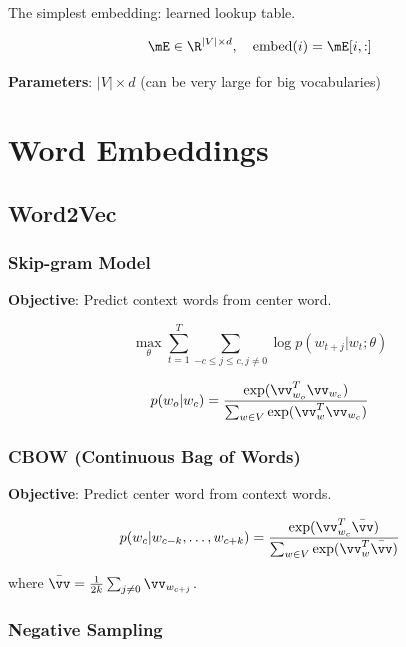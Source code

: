 The simplest embedding: learned lookup table.

\begin{equation}
\mE \in \R^{|V| \times d}, \quad \text{embed}(i) = \mE[i, :]
\end{equation}

\textbf{Parameters}: $|V| \times d$ (can be very large for big vocabularies)

\section{Word Embeddings}
\label{sec:word_embeddings}

\subsection{Word2Vec}

\subsubsection{Skip-gram Model}

\textbf{Objective}: Predict context words from center word.

\begin{equation}
\max_\theta \sum_{t=1}^{T} \sum_{-c \leq j \leq c, j \neq 0} \log p(w_{t+j} | w_t; \theta)
\end{equation}

\begin{equation}
p(w_o | w_c) = \frac{\exp(\vv_{w_o}^T \vv_{w_c})}{\sum_{w \in V} \exp(\vv_w^T \vv_{w_c})}
\end{equation}

\subsubsection{CBOW (Continuous Bag of Words)}

\textbf{Objective}: Predict center word from context words.

\begin{equation}
p(w_c | w_{c-k}, \ldots, w_{c+k}) = \frac{\exp(\vv_{w_c}^T \bar{\vv})}{\sum_{w \in V} \exp(\vv_w^T \bar{\vv})}
\end{equation}

where $\bar{\vv} = \frac{1}{2k}\sum_{j \neq 0} \vv_{w_{c+j}}$.

\subsubsection{Negative Sampling}

